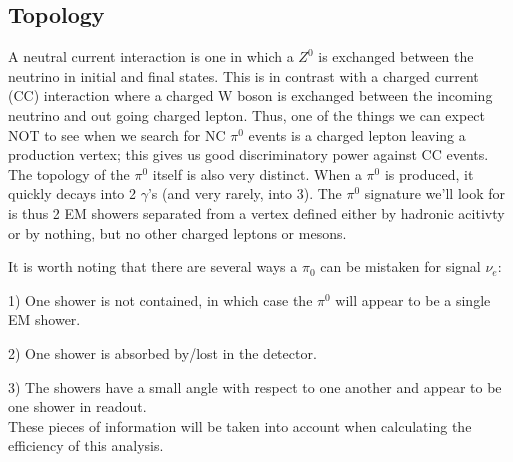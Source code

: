 \documentclass[12pt]{article}
\begin{document}
\subsection{Topology}
\par A neutral current interaction is one in which a $Z^0$ is exchanged between the neutrino in initial and final states. This is in contrast with a charged current (CC) interaction where a charged W boson is exchanged between the incoming neutrino and out going charged lepton. Thus, one of the things we can expect NOT to see when we search for NC $\pi^0$ events is a charged lepton leaving a production vertex; this gives us good discriminatory power against CC events.  The topology of the $\pi^0$ itself is also very distinct.  When a $\pi^0$ is produced, it quickly decays into 2 $\gamma$'s (and very rarely, into 3). The $\pi^0$ signature we'll look for is thus 2 EM showers separated from a vertex defined either by hadronic acitivty or by nothing, but no other charged leptons or mesons. 

It is worth noting that there are several ways a $\pi_0$ can be mistaken for signal $\nu_e$:
\par 1) One shower is not contained, in which case the $\pi^0$ will appear to be a single EM shower.
\par 2) One shower is absorbed by/lost in the detector.
\par 3) The showers have a small angle with respect to one another and appear to be one shower in readout.
\\These pieces of information will be taken into account when calculating the efficiency of this analysis.  
\end{document}
